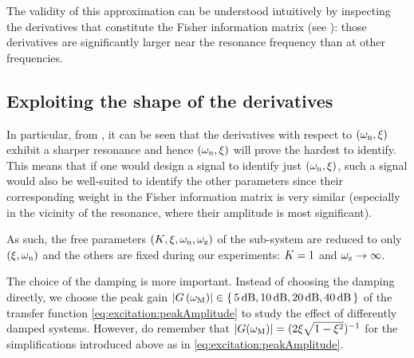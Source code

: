   The validity of this approximation can be understood intuitively by inspecting the derivatives that constitute the Fisher information matrix (see ): those derivatives are significantly larger near the resonance frequency than at other frequencies.

  \subsection{Exploiting the shape of the derivatives}
   In particular, from , it can be seen that the derivatives with respect to $(\omega_{\mathrm{n}}, \xi_{})$ exhibit a sharper resonance and hence $(\omega_{\mathrm{n}}, \xi_{})$ will prove the hardest to identify.
   This means that if one would design a signal to identify just $(\omega_{\mathrm{n}}, \xi_{})$, such a signal would also be well-suited to identify the other parameters since their corresponding weight in the Fisher information matrix is very similar (especially in the vicinity of the resonance, where their amplitude is most significant).

   As such, the free parameters $(K_{}, \xi_{}, \omega_{\mathrm{n}}, \omega_{\mathrm{z}})$ of the sub-system are reduced to only $(\xi_{}, \omega_{\mathrm{n}})$ and the others are fixed during our experiments: $K_{} = 1$ and $\omega_{\mathrm{z}} \to \infty$.


  The choice of the damping is more important.
  Instead of choosing the damping directly, we choose the peak gain $\left| G\left( \omega_{\mathrm{M}} \right) \right| \in \set{5 \ensuremath{\,\mathrm{dB}}, 10 \ensuremath{\,\mathrm{dB}}, 20 \ensuremath{\,\mathrm{dB}}, 40 \ensuremath{\,\mathrm{dB}} }$ of the transfer function \eqref{eq:excitation:peakAmplitude} to study the effect of differently damped systems.
  However, do remember that $\left| G(\omega_{\mathrm{M}}) \right| = (2\xi_{}\sqrt{1-\xi_{}^2})^{-1}$ for the simplifications introduced above as in \eqref{eq:excitation:peakAmplitude}.

